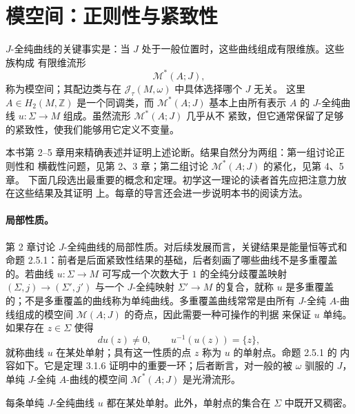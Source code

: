
\section{模空间：正则性与紧致性}\label{sec:1-2}

$J$-全纯曲线的关键事实是：当 $J$ 处于一般位置时，这些曲线组成有限维族。这些族构成
有限维流形
\[
  \mathcal M^*(A;J),
\]
称为模空间；其配边类与在 $\mathcal J_\tau(M,\omega)$ 中具体选择哪个 $J$ 无关。
这里 $A\in H_2(M,\mathbb Z)$ 是一个同调类，而 $\mathcal M^*(A;J)$ 基本上由所有表示
$A$ 的 $J$-全纯曲线 $u:\Sigma\to M$ 组成。虽然流形 $\mathcal M^*(A;J)$ 几乎从不
紧致，但它通常保留了足够的紧致性，使我们能够用它定义不变量。

本书第 2--5 章用来精确表述并证明上述论断。结果自然分为两组：第一组讨论正则性和
横截性问题，见第 2、3 章；第二组讨论 $\mathcal M^*(A;J)$ 的紧化，见第 4、5 章。
下面几段选出最重要的概念和定理。初学这一理论的读者首先应把注意力放在这些结果及其证明
上。每章的导言还会进一步说明本书的阅读方法。

\paragraph{局部性质。}
第 2 章讨论 $J$-全纯曲线的局部性质。对后续发展而言，关键结果是能量恒等式和命题
2.5.1：前者是后面紧致性结果的基础，后者刻画了哪些曲线不是多重覆盖的。若曲线
$u:\Sigma\to M$ 可写成一个次数大于 $1$ 的全纯分歧覆盖映射
$(\Sigma,j)\to(\Sigma',j')$ 与一个 $J$-全纯映射 $\Sigma'\to M$ 的复合，就称 $u$
是多重覆盖的；不是多重覆盖的曲线称为单纯曲线。多重覆盖曲线常常是由所有
$J$-全纯 $A$-曲线组成的模空间 $\mathcal M(A;J)$ 的奇点，因此需要一种可操作的判据
来保证 $u$ 单纯。如果存在 $z\in\Sigma$ 使得
\[
  du(z)\ne0,\qquad u^{-1}(u(z))=\{z\},
\]
就称曲线 $u$ 在某处单射；具有这一性质的点 $z$ 称为 $u$ 的单射点。命题 2.5.1 的
内容如下。它是定理 3.1.6 证明中的重要一环；后者断言，对一般的被 $\omega$ 驯服的
$J$，单纯 $J$-全纯 $A$-曲线的模空间 $\mathcal M^*(A;J)$ 是光滑流形。

\begin{namedproposition}
每条单纯 $J$-全纯曲线 $u$ 都在某处单射。此外，单射点的集合在 $\Sigma$ 中既开又稠密。
\end{namedproposition}

